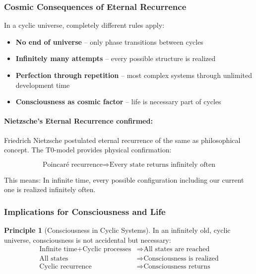 \documentclass[12pt,a4paper]{article}
\theoremstyle{definition}
\newtheorem{principle}{Principle}
\begin{document}
	\subsubsection{Cosmic Consequences of Eternal Recurrence}
	
	\begin{important}
		In a cyclic universe, completely different rules apply:
		\begin{itemize}
			\item \textbf{No end of universe} -- only phase transitions between cycles
			\item \textbf{Infinitely many attempts} -- every possible structure is realized
			\item \textbf{Perfection through repetition} -- most complex systems through unlimited development time
			\item \textbf{Consciousness as cosmic factor} -- life is necessary part of cycles
		\end{itemize}
	\end{important}
	
	\paragraph{Nietzsche's Eternal Recurrence confirmed:}
	Friedrich Nietzsche postulated eternal recurrence of the same as philosophical concept. The T0-model provides physical confirmation:
	
	\begin{equation}
		\text{Poincaré recurrence} \Rightarrow \text{Every state returns infinitely often}
	\end{equation}
	
	This means: In infinite time, every possible configuration including our current one is realized infinitely often.
	
	\subsubsection{Implications for Consciousness and Life}
	
	\begin{principle}[Consciousness in Cyclic Systems]
		In an infinitely old, cyclic universe, consciousness is not accidental but necessary:
		\begin{align}
			\text{Infinite time} + \text{Cyclic processes} &\Rightarrow \text{All states are reached} \\
			\text{All states} &\Rightarrow \text{Consciousness is realized} \\
			\text{Cyclic recurrence} &\Rightarrow \text{Consciousness returns}
		\end{align}
	\end{principle}
	
\end{document}
